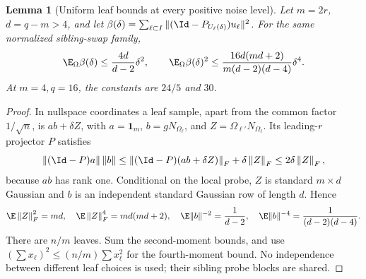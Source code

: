 \documentclass[11pt,oneside,openany,a4paper]{book}
\numberwithin{equation}{chapter}
\newtheorem{lemma}[theorem]{Lemma}
\theoremstyle{definition}
\theoremstyle{remark}
\newcommand{\F}[1]{\left\lVert#1\right\rVert_F}
\begin{document}
\begin{lemma}[Uniform leaf bounds at every positive noise level]\label{nonlinear:lem:leaf}
Let $m=2r$, $d=q-m>4$, and let
$\beta(\delta)=\sum_{\ell\subset I}\|(\Id-P_{U_\ell(\delta)})u_\ell\|^2$.
For the same normalized sibling-swap family,
\begin{equation}\label{nonlinear:eq:leafmom}
 \E_\Omega\beta(\delta)\le\frac{4d}{d-2}\delta^2,\qquad
 \E_\Omega\beta(\delta)^2
 \le\frac{16d(md+2)}{m(d-2)(d-4)}\delta^4.
\end{equation}
At $m=4,q=16$, the constants are $24/5$ and $30$.
\end{lemma}
\begin{proof}
In nullspace coordinates a leaf sample, apart from the common factor $1/\sqrt n$, is $ab+\delta Z$, with $a=\mathbf1_m$, $b=gN_{\Omega_\ell}$, and $Z=\Omega_{\ell'}N_{\Omega_\ell}$. Its leading-$r$ projector $P$ satisfies
\[
 \|(\Id-P)a\|\,\|b\|
 \le\F{(\Id-P)(ab+\delta Z)}+\delta\F Z\le2\delta\F Z,
\]
because $ab$ has rank one. Conditional on the local probe, $Z$ is standard $m\times d$ Gaussian and $b$ is an independent standard Gaussian row of length $d$. Hence
\[
 \E\F Z^2=md,\quad \E\F Z^4=md(md+2),\quad
 \E\|b\|^{-2}=\frac1{d-2},\quad
 \E\|b\|^{-4}=\frac1{(d-2)(d-4)}.
\]
There are $n/m$ leaves. Sum the second-moment bounds, and use
$(\sum x_\ell)^2\le(n/m)\sum x_\ell^2$ for the fourth-moment bound. No independence between different leaf choices is used; their sibling probe blocks are shared.
\end{proof}
\end{document}
